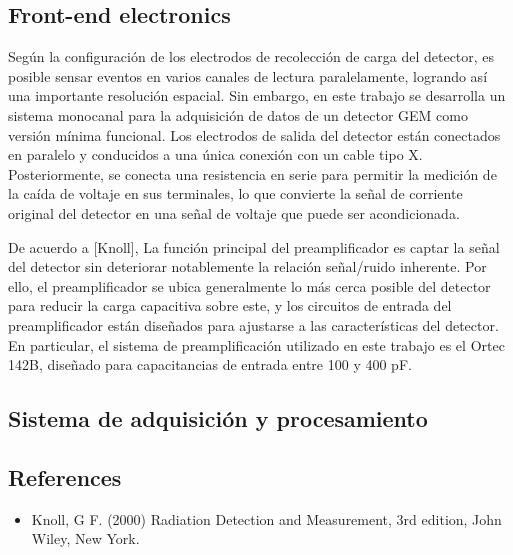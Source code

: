 \documentclass[]{book}
\begin{document}
\subsection*{Front-end electronics}

\noindent Según la configuración de los electrodos de recolección de carga del detector, es posible sensar eventos en varios canales de lectura paralelamente, logrando así una importante resolución espacial. Sin embargo, en este trabajo se desarrolla un sistema monocanal para la adquisición de datos de un detector GEM como versión mínima funcional. Los electrodos de salida del detector están conectados en paralelo y conducidos a una única conexión con un cable tipo X. Posteriormente, se conecta una resistencia en serie para permitir la medición de la caída de voltaje en sus terminales, lo que convierte la señal de corriente original del detector en una señal de voltaje que puede ser acondicionada.


\noindent De acuerdo a [Knoll], La función principal del preamplificador es captar la señal del detector sin deteriorar notablemente la relación señal/ruido inherente. Por ello, el preamplificador se ubica generalmente lo más cerca posible del detector para reducir la carga capacitiva sobre este, y los circuitos de entrada del preamplificador están diseñados para ajustarse a las características del detector. En particular, el sistema de preamplificación utilizado en este trabajo es el Ortec 142B, diseñado para capacitancias de entrada entre 100 y 400 pF. %





\subsection*{Sistema de adquisición y procesamiento}

\noindent 

\subsection*{References}
\begin{itemize}
    \item Knoll, G F. (2000) Radiation Detection and Measurement, 3rd edition, John Wiley, New
    York.
\end{itemize}
\end{document}
